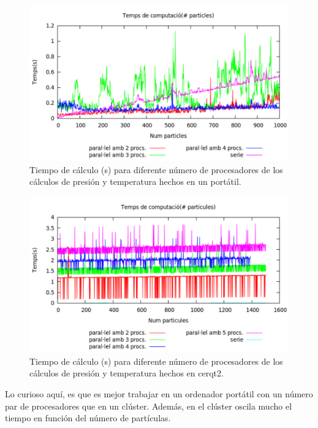 \begin{figure}[h!]
\includegraphics[scale=0.50]{bench_ana_workerII.pdf} 
\caption{Tiempo de cálculo (s) para diferente número de procesadores de los cálculos de presión y temperatura hechos en un portátil.} 
\label{fig:workerii_ana}
\end{figure}
\begin{figure}[h!]
\includegraphics[scale=0.50]{bench_ana_cerqt2.pdf} 
\caption{Tiempo de cálculo (s) para diferente número de procesadores de los cálculos de presión y temperatura hechos en cerqt2.} 
\label{fig:cerqt2_ana}
\end{figure}
Lo curioso aquí, es que es mejor trabajar en un ordenador portátil con un número par de procesadores que en un clúster. Además, en el clúster oscila mucho el tiempo en función del número de partículas.

